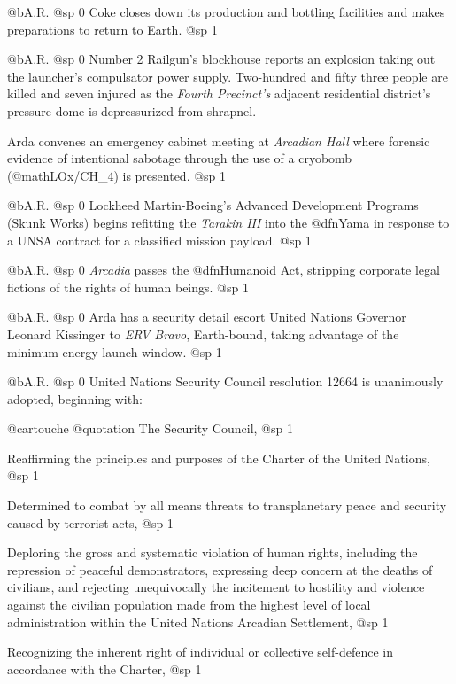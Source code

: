 @b{A.R.}
@sp 0
Coke closes down its production and bottling facilities and makes preparations to return to Earth.
@sp 1

@b{A.R.}
@sp 0
Number 2 Railgun's blockhouse reports an explosion taking out the launcher's compulsator power supply. Two-hundred and fifty three people are killed and seven injured as the {\it Fourth Precinct's} adjacent residential district's pressure dome is depressurized from shrapnel.

Arda convenes an emergency cabinet meeting at {\it Arcadian Hall} where forensic evidence of intentional sabotage through the use of a cryobomb (@math{LOx/CH_4}) is presented.
@sp 1

@b{A.R.}
@sp 0
Lockheed Martin-Boeing's Advanced Development Programs (Skunk Works) begins refitting the {\it Tarakin III} into the @dfn{Yama} in response to a UNSA contract for a classified mission payload.
@sp 1

@b{A.R.}
@sp 0
{\it Arcadia} passes the @dfn{Humanoid Act}, stripping corporate legal fictions of the rights of human beings.
@sp 1

@b{A.R.}
@sp 0
Arda has a security detail escort United Nations Governor Leonard Kissinger to {\it ERV Bravo}, Earth-bound, taking advantage of the minimum-energy launch window.
@sp 1

@b{A.R.}
@sp 0
United Nations Security Council resolution 12664 is unanimously adopted, beginning with:

@cartouche
@quotation
The Security Council,
@sp 1

Reaffirming the principles and purposes of the Charter of the United Nations,
@sp 1

Determined to combat by all means threats to transplanetary peace and security caused by terrorist acts,
@sp 1

Deploring the gross and systematic violation of human rights, including the repression of peaceful demonstrators, expressing deep concern at the deaths of civilians, and rejecting unequivocally the incitement to hostility and violence against the civilian population made from the highest level of local administration within the United Nations Arcadian Settlement,
@sp 1

Recognizing the inherent right of individual or collective self-defence in accordance with the Charter,
@sp 1

